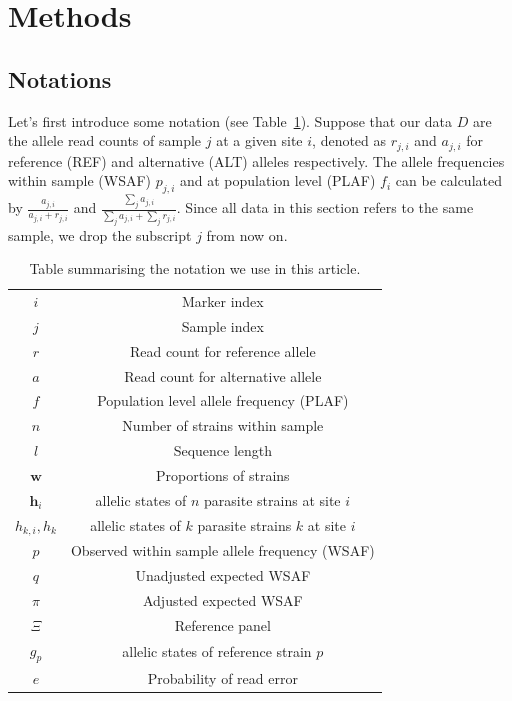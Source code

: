 \documentclass{bioinfo}
\begin{document}
\begin{methods}
\end{methods}


\section{Methods}

\subsection{Notations}
Let's first introduce some notation (see Table~\ref{tab:notation}). Suppose that our data $D$ are the allele read counts of sample $j$ at a given site $i$, denoted as $r_{j,i}$ and $a_{j,i}$ for reference (REF) and alternative (ALT) alleles respectively. The allele frequencies within sample (WSAF) $p_{j,i}$ and at population level (PLAF) $f_i$ can be calculated by $ \frac{a_{j,i}}{a_{j,i} + r_{j,i}}$ and $ \frac{\sum_j a_{j,i}}{\sum_j a_{j,i} + \sum_j r_{j,i}}$. Since all data in this section refers to the same sample, we drop the subscript $j$ from now on.

\begin{table}[htb]\centering
\begin{tabular}{c|c}\hline
$i$              & Marker index\\
$j$              & Sample index \\
$r$              & Read count for reference allele \\
$a$              & Read count for alternative allele \\
$f$              & Population level allele frequency (PLAF) \\
$n$              & Number of strains within sample \\
$l$              & Sequence length \\
$\mathbf w$      & Proportions of strains \\
$\mathbf{h}_{i}$ & allelic states of $n$ parasite strains at site $i$ \\
$h_{k,i}, h_k$   & allelic states of $k$ parasite strains $k$ at site $i$ \\
$p$              & Observed within sample allele frequency (WSAF) \\
$q$              & Unadjusted expected WSAF  \\
$\pi$            & Adjusted expected WSAF \\
$\Xi$            & Reference panel\\
$g_{p}$          & allelic states of reference strain $p$\\
$e$              & Probability of read error\\ \hline
\end{tabular}
\caption{Table summarising the notation we use in this article.}\label{tab:notation}
\end{table}
\end{document}
